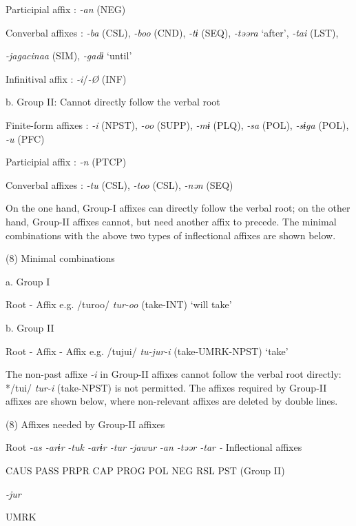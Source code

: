     Participial affix  : \textit{{}-an} (NEG)

    Converbal affixes  : \textit{{}-ba} (CSL), \textit{{}-boo} (CND), \textit{{}-tɨ} (SEQ), \textit{{}-təəra} ‘after’, \textit{{}-tai} (LST),

\textit{{}-jagacinaa} (SIM), \textit{{}-gadɨ} ‘until’

    Infinitival affix  : \textit{{}-i}/\textit{{}-Ø} (INF)

  b.  Group II: Cannot directly follow the verbal root

    Finite-form affixes  : \textit{{}-i} (NPST), \textit{{}-oo} (SUPP), \textit{{}-mɨ} (PLQ), \textit{{}-sa} (POL), \textit{{}-sɨga} (POL), \textit{{}-u} (PFC)

    Participial affix  : \textit{{}-n} (PTCP)

    Converbal affixes  : \textit{{}-tu} (CSL), \textit{{}-too} (CSL), \textit{{}-nən} (SEQ)

On the one hand, Group-I affixes can directly follow the verbal root; on the other hand, Group-II affixes cannot, but need another affix to precede. The minimal combinations with the above two types of inflectional affixes are shown below.

(8)  Minimal combinations

  a.  Group I                

    Root  {}-  Affix        e.g.  /turoo/  \textit{tur-oo}  (take-INT)  ‘will take’

  b.  Group II                

    Root  {}-  Affix  {}-  Affix    e.g.  /tujui/  \textit{tu-jur-i}  (take-UMRK-NPST)  ‘take’

The non-past affixe \textit{{}-i} in Group-II affixes cannot follow the verbal root directly: */tui/ \textit{tur-i} (take-NPST) is not permitted. The affixes required by Group-II affixes are shown below, where non-relevant affixes are deleted by double lines.

(8)  Affixes needed by Group-II affixes

  Root  \textit{{}-as  {}-arɨr} %
\textit{{}-tuk  {}-arɨr  {}-tur  {}-jawur} %
\textit{{}-an  {}-təər  {}-tar  {}-} Inflectional affixes

    CAUS  PASS  PRPR  CAP  PROG  POL  NEG  RSL  PST  (Group II)

          \textit{{}-jur} 

          UMRK    

